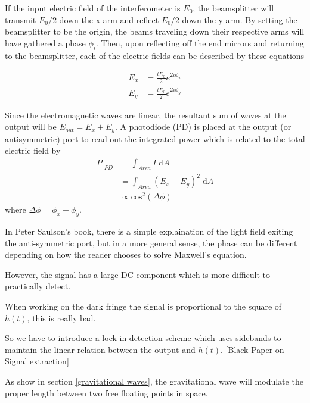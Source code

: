 \documentclass[oneside]{book}
\begin{document}
		If the input electric field of the interferometer is $E_0$, the beamsplitter will transmit $E_0 /2$ down the x-arm and reflect $E_0 /2$ down the y-arm.  By setting the beamsplitter to be the origin,  the beams traveling down their respective arms will have gathered a phase $\phi_i$. Then, upon reflecting off the end mirrors and returning to the beamsplitter, each of the electric fields can be described by these equations
		
			\begin{equation}
			\begin{aligned}
				E_{x} 	&=	\frac{i E_0}{2} e^{2i\phi_{x}}	
			\\	E_{y} 	&=	\frac{i E_0}{2} e^{2i\phi_{y}}
			\end{aligned}
			\end{equation}
			
		Since the electromagnetic waves are linear, the resultant sum of waves at the output will be $E_{out} = E_x + E_y$. A photodiode (PD) is placed at the output (or antisymmetric) port to read out the integrated power which is related to the total electric field by
		\begin{equation}
		\begin{aligned}
			P \vert_{PD}	&= \int_{Area} I \;				\text{d}A 
		\\					&= \int_{Area} (E_x + E_y)^2 \;	\text{d}A 
		\\					&\propto \text{cos}^2(\Delta \phi)
		\end{aligned}
		\end{equation}
		where $\Delta \phi = \phi_{x} - \phi_{y}$.
		
		In Peter Saulson's book, there is a simple explaination of the light field exiting the anti-symmetric port, but in a more general sense, the phase can be different depending on how the reader chooses to solve Maxwell's equation.
		
		However, the signal has a large DC component which is more difficult to practically detect.  
		
		When working on the dark fringe the signal is proportional to the square of $h(t)$, this is really bad.
		
		So we have to introduce a lock-in detection scheme which uses sidebands to maintain the linear relation between the output and $h(t)$.
		[Black Paper on Signal extraction]
		
		As show in section \ref{gravitational waves}, the gravitational wave will modulate the proper length between two free floating points in space. 
	
\end{document}
